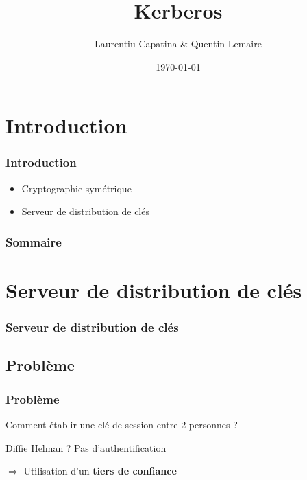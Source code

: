 \documentclass[svgnames]{beamer}
\title{Kerberos}
\author{Laurentiu Capatina \& Quentin Lemaire}
\date{\today}
\begin{document}
  
\maketitle %

\section*{Introduction}

\begin{frame}
  \frametitle{Introduction}
  \begin{itemize}
    \item Cryptographie symétrique
    \item Serveur de distribution de clés
  \end{itemize}
\end{frame}

\begin{frame}
  \frametitle{Sommaire}
  \tableofcontents
\end{frame}


\section{Serveur de distribution de clés}

\begin{frame}
  \frametitle{Serveur de distribution de clés}
\end{frame}


\subsection{Problème}
\begin{frame}
  \frametitle{Problème}
  
  \begin{center}
    Comment établir une clé de session entre 2 personnes ?
  \end{center}
  
  \pause
  
  \begin{alertblock}{Diffie Helman ?}
    Pas d'authentification
  \end{alertblock}
  
  \pause
  
  $\Rightarrow$ Utilisation d'un \textbf{tiers de confiance}
  
%     
\end{frame}
\end{document}

